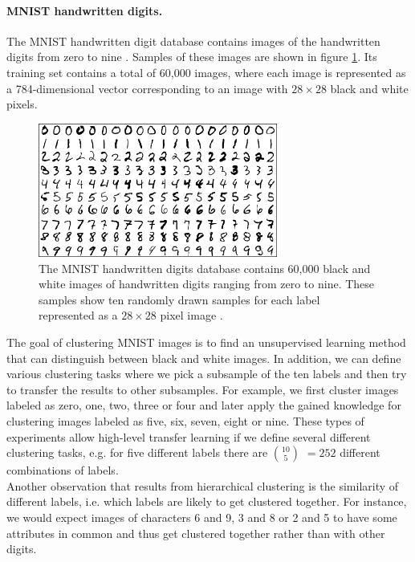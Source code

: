 \paragraph{MNIST handwritten digits.} The MNIST handwritten digit database contains images of the handwritten digits from zero to nine \cite{lecun-mnisthandwrittendigit-2010}. Samples of these images are shown in figure \ref{fig:mnist}. Its training set contains a total of 60,000 images, where each image is represented as a 784-dimensional vector corresponding to an image with $28 \times 28$ black and white pixels.

\begin{figure}[h]
    \centering
    \includegraphics[width=0.7\textwidth]{images/mnist}
    \caption{The MNIST handwritten digits database contains 60,000 black and white images of handwritten digits ranging from zero to nine. These samples show ten randomly drawn samples for each label represented as a $28 \times 28$ pixel image \cite{lecun-mnisthandwrittendigit-2010}.}
    \label{fig:mnist}
\end{figure}

The goal of clustering MNIST images is to find an unsupervised learning method that can distinguish between black and white images. In addition, we can define various clustering tasks where we pick a subsample of the ten labels and then try to transfer the results to other subsamples. For example, we first cluster images labeled as zero, one, two, three or four and later apply the gained knowledge for clustering images labeled as five, six, seven, eight or nine. These types of experiments allow high-level transfer learning if we define several different clustering tasks, e.g. for five different labels there are $10 \choose 5$ $= 252$ different combinations of labels.\\

Another observation that results from hierarchical clustering is the similarity of different labels, i.e. which labels are likely to get clustered together. For instance, we would expect images of characters 6 and 9, 3 and 8 or 2 and 5 to have some attributes in common and thus get clustered together rather than with other digits.

